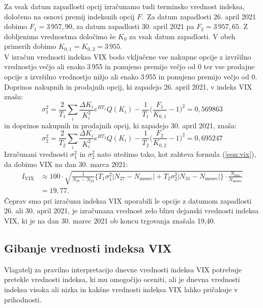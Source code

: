 \documentclass[12pt,a4paper, reqno]{amsart}
\theoremstyle{definition} %
\theoremstyle{plain} %
\begin{document}
Za vsak datum zapadlosti opcij izračunamo tudi terminsko vrednost indeksa, določeno na osnovi premij indeksnih opcij $F$.\
Za datum zapadlosti 26. april 2021 dobimo $F_1=3\,957,\!90$, za datum zapadlosti 30. april 2021 pa $F_2 = 3\,957,\!65$. Z dobljenima vrednostma določimo še $K_0$ za vsak datum zapadlosti. V obeh primerih dobimo $K_{0,1} = K_{0,2} = 3\,955$.\\

V izračun vrednosti indeksa VIX bodo vključene vse nakupne opcije z izvršilno vrednostjo večjo ali enako 3\,955 in ponujeno premijo večjo od 0 ter vse prodajne opcije z izvršilno vrednostjo nižjo ali enako 3\,955 in ponujeno premijo večjo od 0.\\

Doprinos nakupnih in prodajnih opcij, ki zapadejo 26. april 2021, v indeks VIX znaša:
$$
\sigma_1^2 = \frac{2}{T_1}\sum_{i}{}\frac{\Delta K_i}{K_i^2}e^{RT_1}Q(K_i) - \frac{1}{T_1} \Bigg (\frac{F_1}{K_{0,1}} - 1\Bigg )^2 = 0,\!569863
$$ 
in doprinos nakupnih in prodajnih opcij, ki zapadejo 30. april 2021, znaša:
$$
\sigma_2^2 =  \frac{2}{T_2}\sum_{i}{}\frac{\Delta K_i}{K_i^2}e^{RT_2}Q(K_i) - \frac{1}{T_2} \Bigg (\frac{F_2}{K_{0,2}} - 1\Bigg )^2 = 0,\!695247
$$
Izračunani vrednosti $\sigma_1^2$ in $\sigma_2^2$ nato utežimo tako, kot zahteva formula (\ref{eqn:vix}), da dobimo VIX na dan 30. marca 2021:
$$
\begin{aligned}
I_\text{VIX} &\approx  100 \cdot \sqrt{\frac{1}{N_{37}-N_{23}}\Bigg\{T_1\sigma_1^2\left\lvert N_{27} - N_{\text{mesec}}\right\rvert + T_2\sigma_2^2\left\lvert N_{31} - N_{\text{mesec}}\right\rvert \Bigg\}\cdot \frac{N_{\text{leto}}}{N_{\text{mesec}}}} \\
& = 19,\!77.
\end{aligned}
$$
Čeprav smo pri izračunu indeksa VIX uporabili le opcije z datumom zapadlosti 26. ali 30. april 2021, je izračunana vrednost zelo blizu dejanski vrednosti indeksa VIX, ki je na dan 30. marec 2021 ob koncu trgovanja znašala 19,40.



\subsection{Gibanje vrednosti indeksa VIX}

Vlagatelj za pravilno interpretacijo dnevne vrednosti indeksa VIX potrebuje pretekle vrednosti indeksa, ki mu omogočijo oceniti, ali je dnevna vrednosti indeksa visoka ali nizka in kakšne vrednosti indeksa VIX lahko pričakuje v prihodnosti.\\
\end{document}
